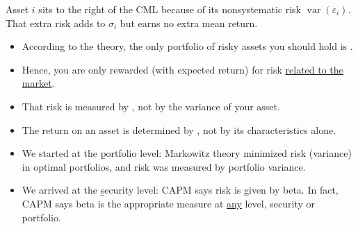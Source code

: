 \begin{center}
\end{center}
Asset $i$ sits to the right of the CML because of its nonsystematic risk $\operatorname{var}(\varepsilon_i)$. That extra risk adds to $\sigma_i$ but earns no extra mean return.

\begin{itemize}
    \item[$\rightarrow$] According to the theory, the only portfolio of risky assets you should hold is .
    \item[$\rightarrow$] Hence, you are only rewarded (with expected return) for risk \ul{related to the market}.
    \item[$\rightarrow$] That risk is measured by \rb{$\beta$}, not by the variance of your asset.
    \item[$\rightarrow$] The return on an asset is determined by , not by its characteristics alone.
\end{itemize}

\begin{itemize}
    \item We started at the \b{portfolio level}: Markowitz theory minimized risk (variance) in optimal portfolios, and risk was measured by portfolio variance.
    \item We arrived at the \b{security level}: CAPM says risk is given by beta. In fact, CAPM says beta is the appropriate measure at \ul{any} level, security or portfolio.
\end{itemize}

